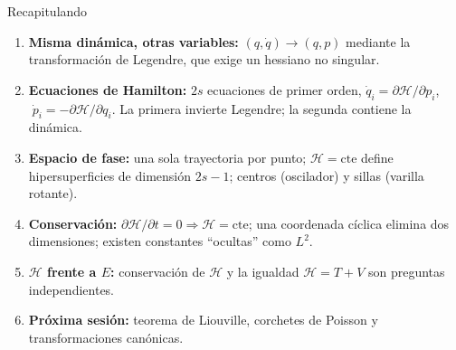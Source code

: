 \documentclass[spanish]{beamer}
\newcommand{\Ham}{\mathcal{H}}               %
\newcommand{\cte}{\text{cte}}
\begin{document}
\begin{frame}{Recapitulando}
\begin{enumerate}[<+->]
  \item \textbf{Misma dinámica, otras variables:} $(q,\dot q)\to(q,p)$ mediante la
        transformación de Legendre, que exige un hessiano no singular.
  \item \textbf{Ecuaciones de Hamilton:} $2s$ ecuaciones de primer orden,
        $\dot q_i=\partial\Ham/\partial p_i$, $\;\dot p_i=-\partial\Ham/\partial q_i$.
        La primera invierte Legendre; la segunda contiene la dinámica.
  \item \textbf{Espacio de fase:} una sola trayectoria por punto; $\Ham=\cte$ define
        hipersuperficies de dimensión $2s-1$; centros (oscilador) y sillas (varilla rotante).
  \item \textbf{Conservación:} $\partial\Ham/\partial t=0\Rightarrow\Ham=\cte$; una coordenada
        cíclica elimina dos dimensiones; existen constantes “ocultas” como $L^2$.
  \item \textbf{$\Ham$ frente a $E$:} conservación de $\Ham$ y la igualdad $\Ham=T+V$ son
        preguntas independientes.
  \item \textbf{Próxima sesión:} teorema de Liouville, corchetes de Poisson y
        transformaciones canónicas.
\end{enumerate}
\end{frame}
\end{document}
